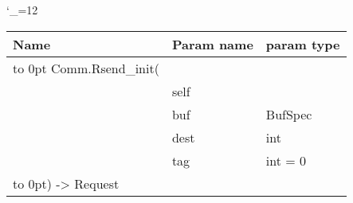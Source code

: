 \begingroup \catcode`\_=12 \tt
\begin{tabular}{lll}
\toprule
\textrm{Name}&\textrm{Param name}&\textrm{param type}\\
\midrule
\hbox to 0pt {Comm.Rsend_init(\hss}\\
& self\\
& buf & BufSpec\\
& dest & int\\
& tag & int = 0\\
\hbox to 0pt{) -> Request\hss}\\
\bottomrule
\end{tabular}
\endgroup
